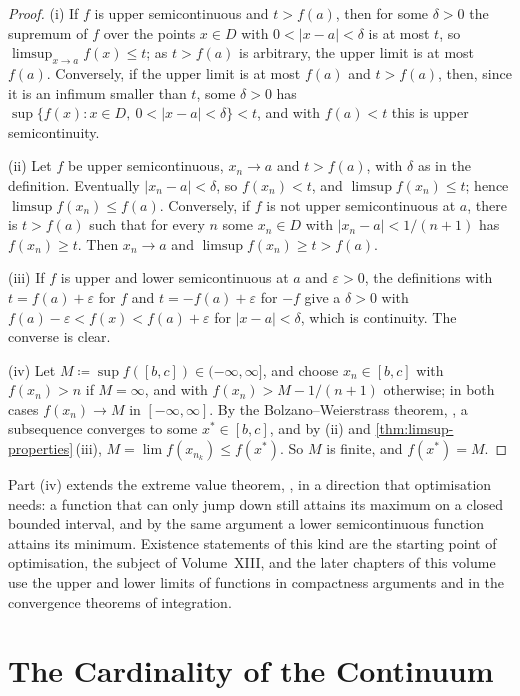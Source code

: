 \begin{proof}
(i) If $f$ is upper semicontinuous and $t>f(a)$, then for some $\delta>0$ the supremum of $f$ over the points $x\in D$ with $0<|x-a|<\delta$ is at most $t$, so $\limsup_{x\to a}f(x)\le t$; as $t>f(a)$ is arbitrary, the upper limit is at most $f(a)$. Conversely, if the upper limit is at most $f(a)$ and $t>f(a)$, then, since it is an infimum smaller than $t$, some $\delta>0$ has $\sup\{f(x): x\in D,\ 0<|x-a|<\delta\}<t$, and with $f(a)<t$ this is upper semicontinuity.

(ii) Let $f$ be upper semicontinuous, $x_n\to a$ and $t>f(a)$, with $\delta$ as in the definition. Eventually $|x_n-a|<\delta$, so $f(x_n)<t$, and $\limsup f(x_n)\le t$; hence $\limsup f(x_n)\le f(a)$. Conversely, if $f$ is not upper semicontinuous at $a$, there is $t>f(a)$ such that for every $n$ some $x_n\in D$ with $|x_n-a|<1/(n+1)$ has $f(x_n)\ge t$. Then $x_n\to a$ and $\limsup f(x_n)\ge t>f(a)$.

(iii) If $f$ is upper and lower semicontinuous at $a$ and $\varepsilon>0$, the definitions with $t=f(a)+\varepsilon$ for $f$ and $t=-f(a)+\varepsilon$ for $-f$ give a $\delta>0$ with $f(a)-\varepsilon<f(x)<f(a)+\varepsilon$ for $|x-a|<\delta$, which is continuity. The converse is clear.

(iv) Let $M\coloneqq\sup f([b,c])\in(-\infty,\infty]$, and choose $x_n\in[b,c]$ with $f(x_n)>n$ if $M=\infty$, and with $f(x_n)>M-1/(n+1)$ otherwise; in both cases $f(x_n)\to M$ in $[-\infty,\infty]$. By the Bolzano--Weierstrass theorem, , a subsequence converges to some $x^*\in[b,c]$, and by (ii) and \cref{thm:limsup-properties}\,(iii), $M=\lim f(x_{n_k})\le f(x^*)$. So $M$ is finite, and $f(x^*)=M$.
\end{proof}

Part (iv) extends the extreme value theorem, , in a direction that optimisation needs: a function that can only jump down still attains its maximum on a closed bounded interval, and by the same argument a lower semicontinuous function attains its minimum. Existence statements of this kind are the starting point of optimisation, the subject of Volume~XIII, and the later chapters of this volume use the upper and lower limits of functions in compactness arguments and in the convergence theorems of integration.

\section{The Cardinality of the Continuum}
\label{sec:continuum}

